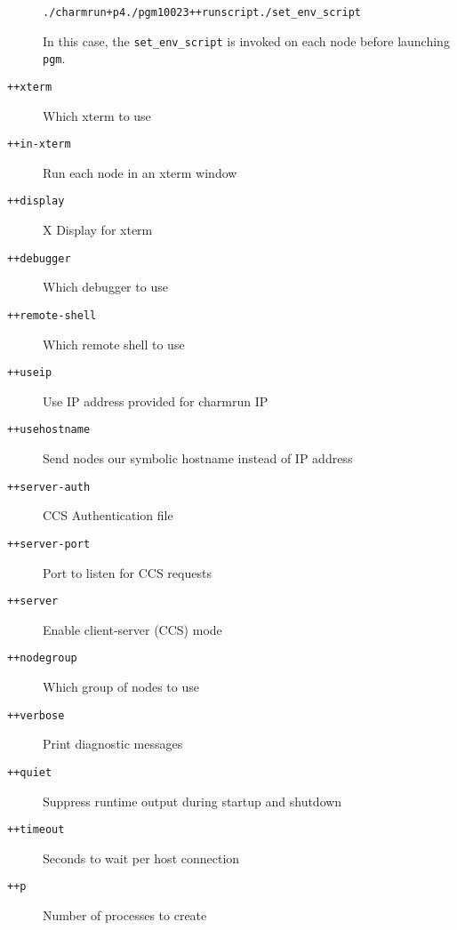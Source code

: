 \begin{description}
\begin{alltt}
./charmrun +p4 ./pgm 100 2 3 ++runscript ./set\_env\_script
\end{alltt}

In this case, the {\tt set\_env\_script} is invoked on each node before launching {\tt pgm}.

\item[{\tt ++xterm}]            Which xterm to use

\item[{\tt ++in-xterm}]         Run each node in an xterm window

\item[{\tt ++display}]          X Display for xterm

\item[{\tt ++debugger}]         Which debugger to use

\item[{\tt ++remote-shell}]     Which remote shell to use

\item[{\tt ++useip}]            Use IP address provided for charmrun IP

\item[{\tt ++usehostname}]      Send nodes our symbolic hostname instead of IP address



\item[{\tt ++server-auth}]      CCS Authentication file

\item[{\tt ++server-port}]      Port to listen for CCS requests

\item[{\tt ++server}]           Enable client-server (CCS) mode

\item[{\tt ++nodegroup}]        Which group of nodes to use

\item[{\tt ++verbose}]          Print diagnostic messages

\item[{\tt ++quiet}]            Suppress runtime output during startup and shutdown

\item[{\tt ++timeout}]          Seconds to wait per host connection

\item[{\tt ++p}]                Number of processes to create

\end{description}

